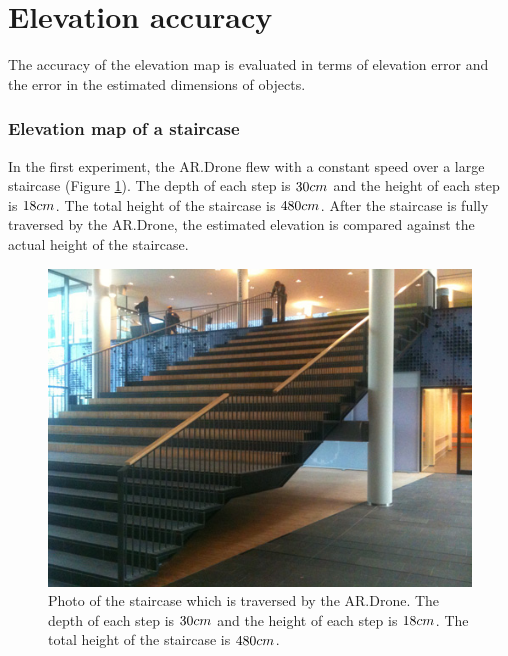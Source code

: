 \clearpage
\section{Elevation accuracy}
\label{sec:results-elevation-accuracy}
The accuracy of the elevation map is evaluated in terms of elevation error and the error in the estimated dimensions of objects.

\subsubsection{Elevation map of a staircase}

In the first experiment, the AR.Drone flew with a constant speed over a large staircase (Figure \ref{fig:exp2-stair-photo}).
The depth of each step is $30\begin{small}cm\end{small}$ and the height of each step is $18\begin{small}cm\end{small}$.
The total height of the staircase is $480\begin{small}cm\end{small}$.
After the staircase is fully traversed by the AR.Drone, the estimated elevation is compared against the actual height of the staircase.

\begin{figure}[htb!]
\centering
\includegraphics[width=0.4\linewidth]{images/exp2-stair-photo.jpg}
\caption{Photo of the staircase which is traversed by the AR.Drone. The depth of each step is $30\small{cm}$ and the height of each step is $18\small{cm}$. The total height of the staircase is $480\small{cm}$.}
\label{fig:exp2-stair-photo}
\end{figure}

